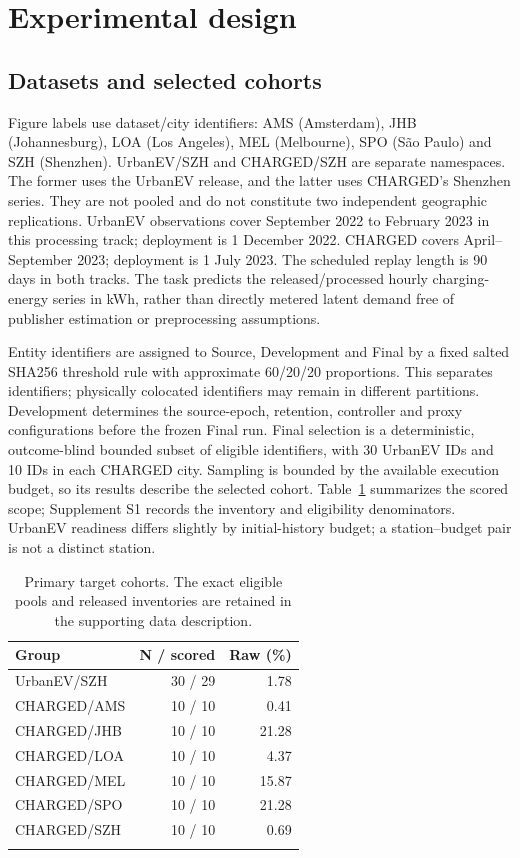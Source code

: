 \documentclass[pdflatex,iicol,sn-mathphys-num]{sn-jnl}
\begin{document}
\section{Experimental design}\label{sec:experiment}
\subsection{Datasets and selected cohorts}
Figure labels use dataset/city identifiers: AMS (Amsterdam), JHB (Johannesburg), LOA (Los Angeles), MEL (Melbourne), SPO (S\~ao Paulo) and SZH (Shenzhen). UrbanEV/SZH and CHARGED/SZH are separate namespaces. The former uses the UrbanEV release, and the latter uses CHARGED's Shenzhen series. They are not pooled and do not constitute two independent geographic replications. UrbanEV observations cover September 2022 to February 2023 in this processing track; deployment is 1 December 2022. CHARGED covers April--September 2023; deployment is 1 July 2023. The scheduled replay length is 90 days in both tracks. The task predicts the released/processed hourly charging-energy series in kWh, rather than directly metered latent demand free of publisher estimation or preprocessing assumptions.

Entity identifiers are assigned to Source, Development and Final by a fixed salted SHA256 threshold rule with approximate 60/20/20 proportions. This separates identifiers; physically colocated identifiers may remain in different partitions. Development determines the source-epoch, retention, controller and proxy configurations before the frozen Final run. Final selection is a deterministic, outcome-blind bounded subset of eligible identifiers, with 30 UrbanEV IDs and 10 IDs in each CHARGED city. Sampling is bounded by the available execution budget, so its results describe the selected cohort. Table~\ref{tab:scope} summarizes the scored scope; Supplement S1 records the inventory and eligibility denominators. UrbanEV readiness differs slightly by initial-history budget; a station--budget pair is not a distinct station.

\begin{table}[t]\centering\small
\caption{Primary target cohorts. The exact eligible pools and released inventories are retained in the supporting data description.}\label{tab:scope}
\begin{tabular}{@{}lrr@{}}\toprule
Group & N / scored & Raw (\%)\\\midrule
UrbanEV/SZH & 30 / 29 & 1.78\\
CHARGED/AMS & 10 / 10 & 0.41\\
CHARGED/JHB & 10 / 10 & 21.28\\
CHARGED/LOA & 10 / 10 & 4.37\\
CHARGED/MEL & 10 / 10 & 15.87\\
CHARGED/SPO & 10 / 10 & 21.28\\
CHARGED/SZH & 10 / 10 & 0.69\\\botrule
\end{tabular}\end{table}
\end{document}
